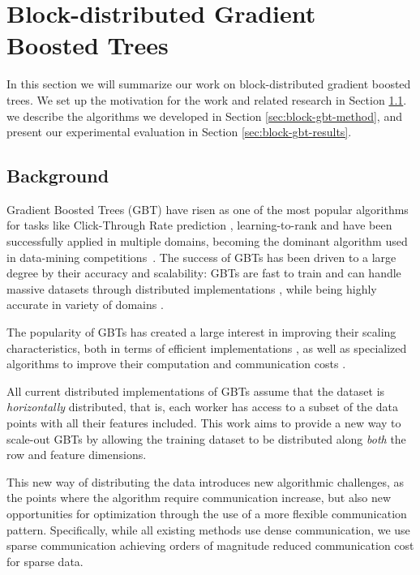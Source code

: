 \chapter{Block-distributed Gradient Boosted Trees}

In this section we will summarize our work on block-distributed
gradient boosted trees. We set up the motivation for the work
and related research in Section \ref{sec:block-gbt-background}.
we describe the algorithms we developed in Section \ref{sec:block-gbt-method},
and present our experimental evaluation in Section \ref{sec:block-gbt-results}.

\section{Background}
\label{sec:block-gbt-background}

Gradient Boosted Trees (GBT) have risen as one of the most popular algorithms for
tasks like Click-Through Rate prediction \cite{ctr-facebook}, learning-to-rank \cite{mcrank} and have been
successfully applied in multiple domains, becoming the dominant
algorithm used in data-mining competitions~\cite{xgboost}.
The success of GBTs has been driven to a large degree by their
accuracy and scalability: GBTs are fast to train and can handle massive datasets
through distributed implementations \cite{xgboost, lightgbm}, while being
highly accurate in variety of domains \cite{xgboost, hundreds-classifiers}.

The popularity of GBTs has created a large interest
in improving their scaling characteristics,
both in terms of efficient implementations \cite{xgboost, lightgbm, dimboost},
as well as specialized algorithms to improve their computation and communication
costs \cite{comm-efficient-gbt, online-gradient-boosting}.

All current distributed implementations of GBTs assume that the dataset is
\emph{horizontally} distributed, that is, each worker has access to
a subset of the data points with all their features included.
This work aims to provide a new way to scale-out GBTs by allowing the training
dataset to be distributed along \emph{both} the row and feature dimensions.

This new way of distributing the data introduces new algorithmic challenges,
as the points where the algorithm require communication increase, but also new opportunities
for optimization through the use of a more flexible communication pattern.
Specifically, while all existing methods use dense communication,
we use sparse communication achieving orders of magnitude reduced communication
cost for sparse data.

